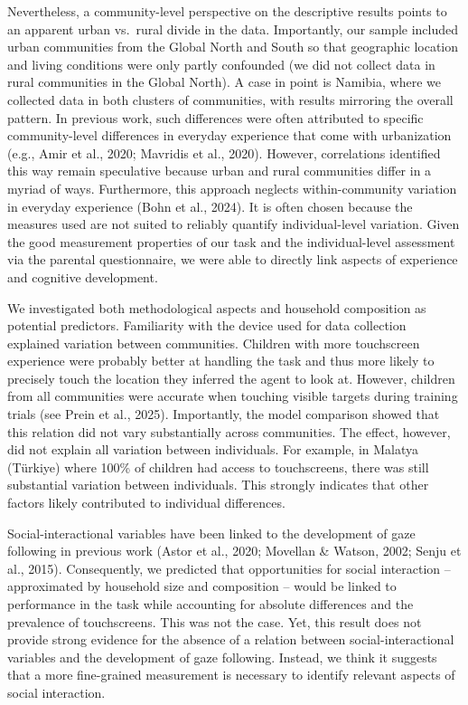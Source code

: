 \documentclass[
  man,floatsintext]{apa7}
\begin{document}
Nevertheless, a community-level perspective on the descriptive results points to an apparent urban vs.~rural divide in the data. Importantly, our sample included urban communities from the Global North and South so that geographic location and living conditions were only partly confounded (we did not collect data in rural communities in the Global North). A case in point is Namibia, where we collected data in both clusters of communities, with results mirroring the overall pattern. In previous work, such differences were often attributed to specific community-level differences in everyday experience that come with urbanization (e.g., Amir et al., 2020; Mavridis et al., 2020). However, correlations identified this way remain speculative because urban and rural communities differ in a myriad of ways. Furthermore, this approach neglects within-community variation in everyday experience (Bohn et al., 2024). It is often chosen because the measures used are not suited to reliably quantify individual-level variation. Given the good measurement properties of our task and the individual-level assessment via the parental questionnaire, we were able to directly link aspects of experience and cognitive development.

We investigated both methodological aspects and household composition as potential predictors. Familiarity with the device used for data collection explained variation between communities. Children with more touchscreen experience were probably better at handling the task and thus more likely to precisely touch the location they inferred the agent to look at. However, children from all communities were accurate when touching visible targets during training trials (see Prein et al., 2025). Importantly, the model comparison showed that this relation did not vary substantially across communities. The effect, however, did not explain all variation between individuals. For example, in Malatya (Türkiye) where 100\% of children had access to touchscreens, there was still substantial variation between individuals. This strongly indicates that other factors likely contributed to individual differences.

Social-interactional variables have been linked to the development of gaze following in previous work (Astor et al., 2020; Movellan \& Watson, 2002; Senju et al., 2015). Consequently, we predicted that opportunities for social interaction -- approximated by household size and composition -- would be linked to performance in the task while accounting for absolute differences and the prevalence of touchscreens. This was not the case. Yet, this result does not provide strong evidence for the absence of a relation between social-interactional variables and the development of gaze following. Instead, we think it suggests that a more fine-grained measurement is necessary to identify relevant aspects of social interaction.
\end{document}
